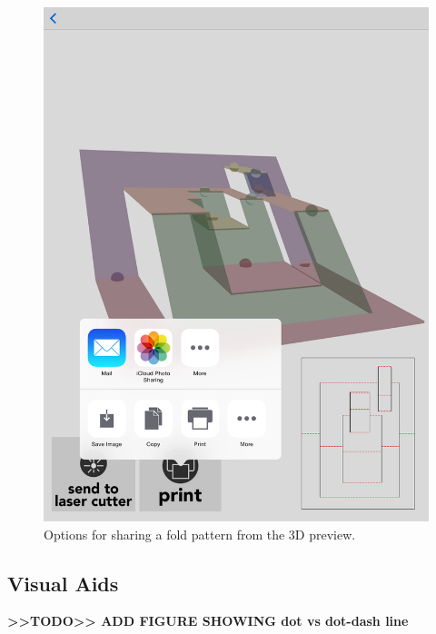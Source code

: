 \begin{figure}[htbp]
\centering
\includegraphics{figures/32_UI_Tool_Interactions/3d-share.png}
\caption{Options for sharing a fold pattern from the 3D preview.}
\end{figure}

\subsection{Visual Aids}\label{visual-aids}

\textbf{\textgreater{}\textgreater{}TODO\textgreater{}\textgreater{} ADD
FIGURE SHOWING dot vs dot-dash line}

